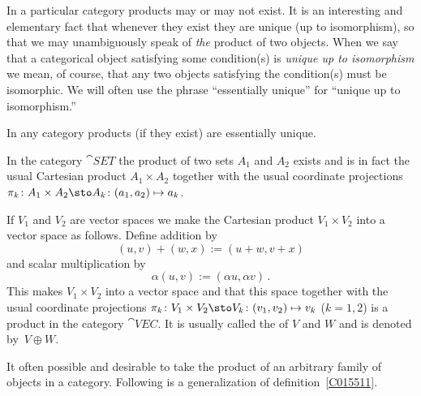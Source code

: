 In a particular category products may or may not exist.  It is an interesting and
elementary fact that whenever they exist they are unique (up to isomorphism), so that we
may unambiguously speak of \emph{the} product of two objects.  When we say that a
categorical object satisfying some condition(s) is \emph{unique up to isomorphism} we
mean, of course, that any two objects satisfying the condition(s) must be isomorphic.  We
will often use the phrase
``essentially unique'' for ``unique up to isomorphism.''

\begin{prop} In any category products (if they exist) are
essentially unique.
\end{prop}

\begin{exam}\label{C015517} In the category $\cat{SET}$ the
product of two sets $A_1$ and $A_2$ exists and is in fact the usual Cartesian product
$A_1 \times A_2$ together with the usual coordinate projections $\pi_k\colon A_1 \times
A_2 \sto A_k \colon (a_1,a_2) \mapsto a_k$.
\end{exam}

\begin{exam}\label{C015521} If $V_1$ and $V_2$ are vector spaces we make the Cartesian product
$V_1 \times V_2$ into a vector space as follows. Define addition by
  \[ (u,v) + (w,x) := (u + w, v + x)  \]
and scalar multiplication by
  \[ \alpha (u,v) := (\alpha u, \alpha v) \,. \]
This makes $V_1 \times V_2$ into a vector space and that this space together with the
usual coordinate projections $\pi_k\colon V_1 \times V_2 \sto V_k \colon (v_1,v_2)
\mapsto v_k$ ($k = 1,2$) is a
product in the category $\cat{VEC}$. It is usually called the
 of $V$ and $W$ and is denoted by~$V \oplus W$.
\end{exam}

It often possible and desirable to take the product of an arbitrary family of objects in
a category.  Following is a generalization of definition~\ref{C015511}.

